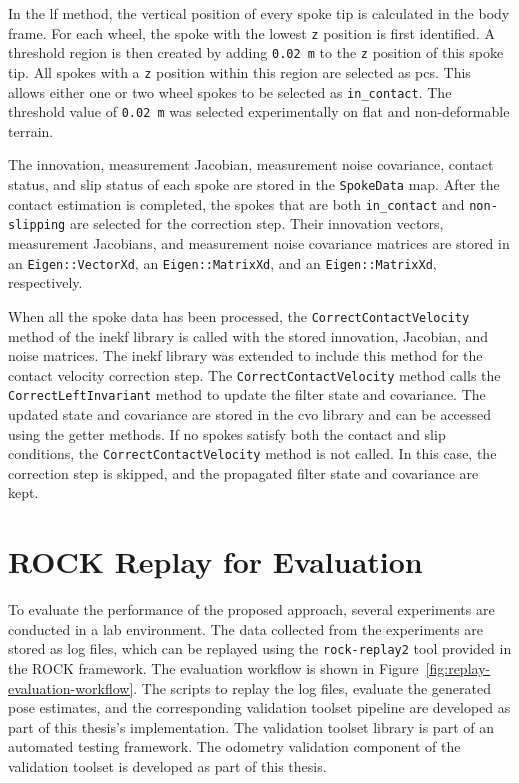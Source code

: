 \documentclass[report.tex]{subfiles}
\begin{document}
    In the \gls{lf} method, the vertical position of every spoke tip is calculated in the body frame. For each wheel, the spoke with the lowest \texttt{z} position is first identified. A threshold region is then created by adding \texttt{0.02 m} to the \texttt{z} position of this spoke tip. All spokes with a \texttt{z} position within this region are selected as \glspl{pc}. This allows either one or two wheel spokes to be selected as \texttt{in\_contact}. The threshold value of \texttt{0.02 m} was selected experimentally on flat and non-deformable terrain.

    The innovation, measurement Jacobian, measurement noise covariance, contact status, and slip status of each spoke are stored in the \texttt{SpokeData} map. After the contact estimation is completed, the spokes that are both \texttt{in\_contact} and \texttt{non-slipping} are selected for the correction step. Their innovation vectors, measurement Jacobians, and measurement noise covariance matrices are stored in an \texttt{Eigen::VectorXd}, an \texttt{Eigen::MatrixXd}, and an \texttt{Eigen::MatrixXd}, respectively.

    When all the spoke data has been processed, the \texttt{CorrectContactVelocity} method of the \gls{inekf} library is called with the stored innovation, Jacobian, and noise matrices. The \gls{inekf} library was extended to include this method for the contact velocity correction step. The \texttt{CorrectContactVelocity} method calls the \texttt{CorrectLeftInvariant} method to update the filter state and covariance. The updated state and covariance are stored in the \gls{cvo} library and can be accessed using the getter methods. If no spokes satisfy both the contact and slip conditions, the \texttt{CorrectContactVelocity} method is not called. In this case, the correction step is skipped, and the propagated filter state and covariance are kept.
    
    \section{ROCK Replay for Evaluation}
    
    To evaluate the performance of the proposed approach, several experiments are conducted in a lab environment. The data collected from the experiments are stored as log files, which can be replayed using the \texttt{rock-replay2} tool provided in the ROCK framework. The evaluation workflow is shown in Figure~\ref{fig:replay-evaluation-workflow}. The scripts to replay the log files, evaluate the generated pose estimates, and the corresponding validation toolset pipeline are developed as part of this thesis's implementation. The validation toolset library is part of an automated testing framework. The odometry validation component of the validation toolset is developed as part of this thesis.
    
\end{document}
